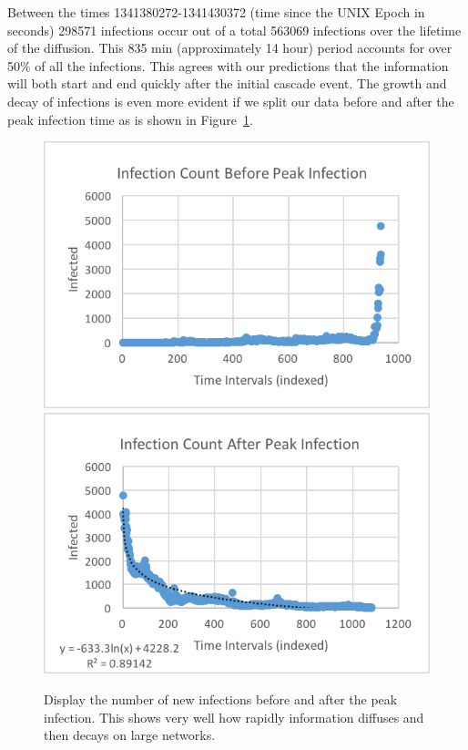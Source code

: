 \documentclass[12pt, oneside, openany]{article} %
\begin{document}
Between the times 1341380272-1341430372 (time since the UNIX Epoch in seconds) 298571 infections occur out of a total 563069 infections over the lifetime of the diffusion. This 835 min (approximately 14 hour) period accounts for over 50\% of all the infections. This agrees with our predictions that the information will both start and end quickly after the initial cascade event. The growth and decay of infections is even more evident if we split our data before and after the peak infection time as is shown in Figure~\ref{fig:before-after}.

\begin{figure}
\centering
    \includegraphics{before.png}
      \includegraphics{after.png}
    \caption{Display the number of new infections before and after the peak infection. This shows very well how rapidly information diffuses and then decays on large networks.}
    \label{fig:before-after}
\end{figure}
\end{document}
